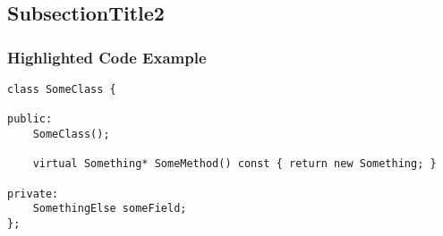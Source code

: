 \documentclass{beamer}
\begin{document}
\subsection{SubsectionTitle2}
\begin{frame}[fragile]\frametitle{Highlighted Code Example}
\begin{verbatim}
class SomeClass {

public:
    SomeClass();

    virtual Something* SomeMethod() const { return new Something; }

private:
    SomethingElse someField;
};
\end{verbatim}
\end{frame}
\end{document}
